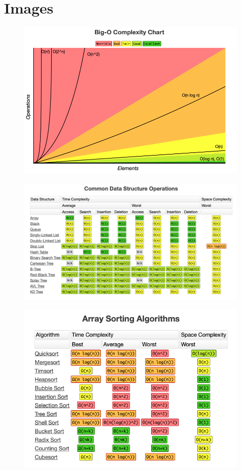 \documentclass{article}
\begin{document}
\section{Images}
\begin{figure}[!ht]
  \includegraphics[width=\linewidth]{Images/BigO_Chart.png}
  \label{fig:Chart}
\end{figure}

\begin{figure}[!ht]
  \includegraphics[width=\linewidth]{Images/DataStrucOpt.png}
  \label{fig:Chart2}
\end{figure}

\begin{figure}[!ht]
  \includegraphics[width=\linewidth]{Images/ArraySortAlg.png}
  \label{fig:Chart3}
\end{figure}
\end{document}
